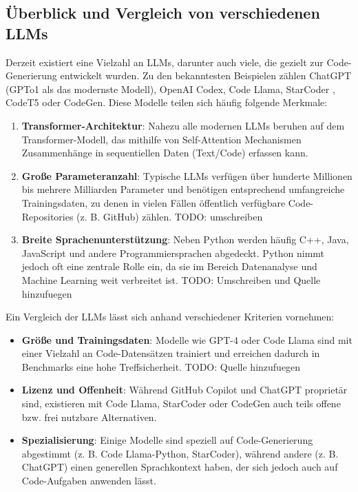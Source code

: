 \documentclass[11pt,a4paper]{article}
\begin{document}
\subsection{Überblick und Vergleich von verschiedenen LLMs}
Derzeit existiert eine Vielzahl an LLMs, darunter auch viele, die gezielt zur Code-Generierung entwickelt wurden. Zu den bekanntesten Beispielen zählen ChatGPT (GPTo1 als das modernste Modell), OpenAI Codex, Code Llama\cite{rozière2024codellamaopenfoundation}, StarCoder \cite{li2023starcodersourceyou}, CodeT5\cite{wang2021codet5identifierawareunifiedpretrained} oder CodeGen\cite{nijkamp2023codegenopenlargelanguage}. Diese Modelle teilen sich häufig folgende Merkmale:
\begin{enumerate}
    \item \textbf{Transformer-Architektur}: Nahezu alle modernen LLMs beruhen auf dem Transformer-Modell, das mithilfe von Self-Attention Mechanismen Zusammenhänge in sequentiellen Daten (Text/Code) erfassen kann\cite{9413901}.
    \item \textbf{Große Parameteranzahl}: Typische LLMs verfügen über hunderte Millionen bis mehrere Milliarden Parameter und benötigen entsprechend umfangreiche Trainingsdaten, zu denen in vielen Fällen öffentlich verfügbare Code-Repositories (z. B. GitHub) zählen. TODO: umschreiben
    \item \textbf{Breite Sprachenunterstützung}: Neben Python werden häufig C++, Java, JavaScript und andere Programmiersprachen abgedeckt. Python nimmt jedoch oft eine zentrale Rolle ein, da sie im Bereich Datenanalyse und Machine Learning weit verbreitet ist. TODO: Umschreiben und Quelle hinzufuegen
\end{enumerate}
Ein Vergleich der LLMs lässt sich anhand verschiedener Kriterien vornehmen:
\begin{itemize}
    \item \textbf{Größe und Trainingsdaten}: Modelle wie GPT-4 oder Code Llama sind mit einer Vielzahl an Code-Datensätzen trainiert und erreichen dadurch in Benchmarks eine hohe Treffsicherheit. TODO: Quelle hinzufuegen
    \item \textbf{Lizenz und Offenheit}: Während GitHub Copilot und ChatGPT proprietär sind, existieren mit Code Llama, StarCoder oder CodeGen auch teils offene bzw. frei nutzbare Alternativen.
    \item \textbf{Spezialisierung}: Einige Modelle sind speziell auf Code-Generierung abgestimmt (z. B. Code Llama-Python, StarCoder), während andere (z. B. ChatGPT) einen generellen Sprachkontext haben, der sich jedoch auch auf Code-Aufgaben anwenden lässt.
\end{itemize}
\end{document}
